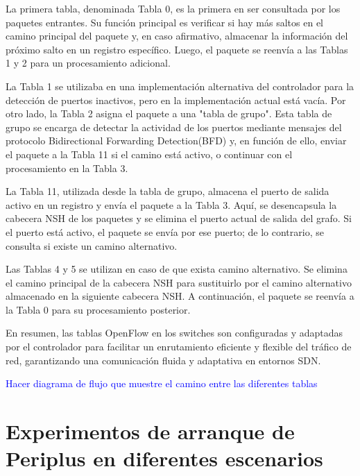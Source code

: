 \documentclass[a4paper, 12pt]{book}
\begin{document}
	La primera tabla, denominada Tabla 0, es la primera en ser consultada por los paquetes entrantes. Su función principal es verificar si hay más saltos en el camino principal del paquete y, en caso afirmativo, almacenar la información del próximo salto en un registro específico. Luego, el paquete se reenvía a las Tablas 1 y 2 para un procesamiento adicional.
	
	La Tabla 1 se utilizaba en una implementación alternativa del controlador para la detección de puertos inactivos, pero en la implementación actual está vacía. Por otro lado, la Tabla 2 asigna el paquete a una "tabla de grupo". Esta tabla de grupo se encarga de detectar la actividad de los puertos mediante mensajes del protocolo Bidirectional Forwarding Detection(BFD) y, en función de ello, enviar el paquete a la Tabla 11 si el camino está activo, o continuar con el procesamiento en la Tabla 3.
	
	La Tabla 11, utilizada desde la tabla de grupo, almacena el puerto de salida activo en un registro y envía el paquete a la Tabla 3. Aquí, se desencapsula la cabecera NSH de los paquetes y se elimina el puerto actual de salida del grafo. Si el puerto está activo, el paquete se envía por ese puerto; de lo contrario, se consulta si existe un camino alternativo.
	
	Las Tablas 4 y 5 se utilizan en caso de que exista camino alternativo. Se elimina el camino principal de la cabecera NSH para sustituirlo por el camino alternativo almacenado en la siguiente cabecera NSH. A continuación, el paquete se reenvía a la Tabla 0 para su procesamiento posterior.
	
	En resumen, las tablas OpenFlow en los switches son configuradas y adaptadas por el controlador para facilitar un enrutamiento eficiente y flexible del tráfico de red, garantizando una comunicación fluida y adaptativa en entornos SDN.
	
	 \textcolor{blue}{Hacer diagrama de flujo que muestre el camino entre las diferentes tablas}
	
	
	\cleardoublepage
	\chapter{Experimentos de arranque de Periplus en diferentes escenarios}
	\label{chap:experimentos}
	
\end{document}
